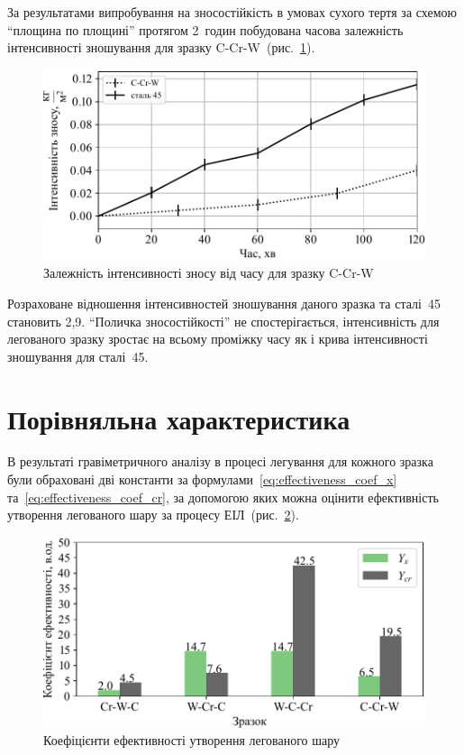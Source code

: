 \documentclass[a4paper,fontsize=14bp,ukrainian]{extreport}
\begin{document}
За результатами випробування на зносостійкість в умовах сухого тертя за схемою ``площина по площині'' протягом 2~годин побудована часова залежність інтенсивності зношування для зразку C-Cr-W~(рис.~\ref{fig:plt_wear_C-Cr-W}).

\begin{figure}[H]
\centering
\includegraphics[]{plt_wear_C-Cr-W.pdf}
\caption{Залежність інтенсивності зносу від часу для зразку C-Cr-W}
\label{fig:plt_wear_C-Cr-W}
\end{figure}

Розраховане відношення інтенсивностей зношування даного зразка та сталі~45 становить 2,9. ``Поличка зносостійкості'' не спостерігається, інтенсивність для легованого зразку зростає на всьому проміжку часу як і крива інтенсивності зношування для сталі~45.

\section{Порівняльна характеристика}

В результаті гравіметричного аналізу в процесі легування для кожного зразка були обраховані дві константи за формулами~\eqref{eq:effectiveness_coef_x} та~\eqref{eq:effectiveness_coef_cr}, за допомогою яких можна оцінити ефективність утворення легованого шару за процесу ЕІЛ~(рис.~\ref{fig:comp_grav}).

\begin{figure}[H]
\centering
\includegraphics[]{comp_grav.pdf}
\caption{Коефіцієнти ефективності утворення легованого шару}
\label{fig:comp_grav}
\end{figure}
\end{document}
